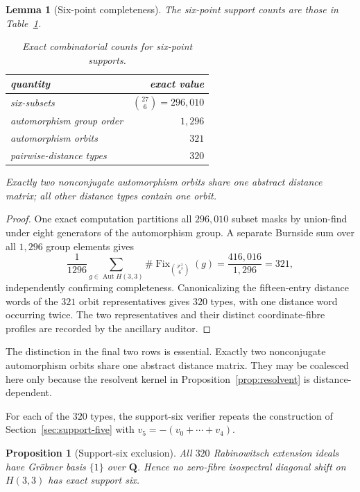 \documentclass[11pt,reqno]{amsart}
\newtheorem{proposition}[theorem]{Proposition}
\newtheorem{lemma}[theorem]{Lemma}
\theoremstyle{definition}
\theoremstyle{remark}
\DeclareMathOperator{\Aut}{Aut}
\newcommand{\Q}{\mathbf Q}
\begin{document}
\begin{lemma}[Six-point completeness]\label{lem:six-completeness}
The six-point support counts are those in Table~\ref{tab:six-counts}.
\begin{table}[htbp]
\centering
\caption{Exact combinatorial counts for six-point supports.}
\label{tab:six-counts}
\begin{tabular}{lr}
\toprule
quantity & exact value\\
\midrule
six-subsets & $\binom{27}{6}=296{,}010$\\
automorphism group order & $1{,}296$\\
automorphism orbits & $321$\\
pairwise-distance types & $320$\\
\bottomrule
\end{tabular}
\end{table}
Exactly two nonconjugate automorphism orbits share one abstract distance
matrix; all other distance types contain one orbit.
\end{lemma}

\begin{proof}
One exact computation partitions all $296{,}010$ subset masks by union-find
under eight generators of the automorphism group.  A separate Burnside sum
over all $1{,}296$ group elements gives
\[
 \frac{1}{1296}\sum_{g\in\Aut H(3,3)}
 \#\operatorname{Fix}_{\binom{\mathcal F_3^3}{6}}(g)
 =\frac{416{,}016}{1{,}296}=321,
\]
independently confirming completeness.  Canonicalizing the fifteen-entry
distance words of the $321$ orbit representatives gives $320$ types, with
one distance word occurring twice.  The two representatives and their
distinct coordinate-fibre profiles are recorded by the ancillary auditor.
\end{proof}

The distinction in the final two rows is essential.  Exactly two
nonconjugate automorphism orbits share one abstract distance matrix.  They
may be coalesced here only because the resolvent kernel in
Proposition~\ref{prop:resolvent} is distance-dependent.

For each of the $320$ types, the support-six verifier repeats the construction
of Section~\ref{sec:support-five} with $v_5=-(v_0+\cdots+v_4)$.

\begin{proposition}[Support-six exclusion]\label{prop:support6}
All $320$ Rabinowitsch extension ideals have Gr\"obner basis $\{1\}$ over
$\Q$.  Hence no zero-fibre isospectral diagonal shift on $H(3,3)$ has
exact support six.
\end{proposition}
\end{document}
